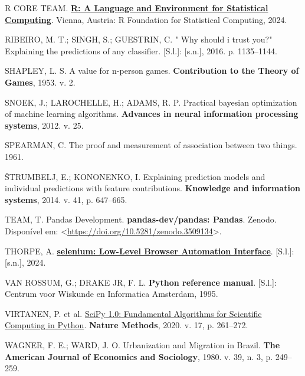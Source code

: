 \documentclass[
  12pt,
  a4paper,
]{scrreprt}
\newlength{\cslhangindent}
\newenvironment{CSLReferences}[2] %
 {\begin{list}{}{%
  \setlength{\itemindent}{0pt}
  \setlength{\leftmargin}{0pt}
  \setlength{\parsep}{0pt}
  \ifodd #1
   \setlength{\leftmargin}{\cslhangindent}
   \setlength{\itemindent}{-1\cslhangindent}
  \fi
  \setlength{\itemsep}{#2\baselineskip}}}
 {\end{list}}
\begin{document}
\begin{CSLReferences}{0}{1}
R CORE TEAM. \textbf{\href{https://www.R-project.org/}{R: A Language and
Environment for Statistical Computing}}. Vienna, Austria: R Foundation
for Statistical Computing, 2024.

RIBEIRO, M. T.; SINGH, S.; GUESTRIN, C. " Why should i trust you?"
Explaining the predictions of any classifier. {[}S.l.{]}: {[}s.n.{]},
2016. p. 1135--1144.

SHAPLEY, L. S. A value for n-person games. \textbf{Contribution to the
Theory of Games}, 1953. v. 2.

SNOEK, J.; LAROCHELLE, H.; ADAMS, R. P. Practical bayesian optimization
of machine learning algorithms. \textbf{Advances in neural information
processing systems}, 2012. v. 25.

SPEARMAN, C. The proof and measurement of association between two
things. 1961.

ŠTRUMBELJ, E.; KONONENKO, I. Explaining prediction models and individual
predictions with feature contributions. \textbf{Knowledge and
information systems}, 2014. v. 41, p. 647--665.

TEAM, T. Pandas Development. \textbf{pandas-dev/pandas: Pandas}. Zenodo.
Disponível em:
\textless{}\url{https://doi.org/10.5281/zenodo.3509134}\textgreater.

THORPE, A.
\textbf{\href{https://CRAN.R-project.org/package=selenium}{selenium:
Low-Level Browser Automation Interface}}. {[}S.l.{]}: {[}s.n.{]}, 2024.

VAN ROSSUM, G.; DRAKE JR, F. L. \textbf{Python reference manual}.
{[}S.l.{]}: Centrum voor Wiskunde en Informatica Amsterdam, 1995.

VIRTANEN, P. et al.
\href{https://doi.org/10.1038/s41592-019-0686-2}{{{SciPy} 1.0:
Fundamental Algorithms for Scientific Computing in Python}}.
\textbf{Nature Methods}, 2020. v. 17, p. 261--272.

WAGNER, F. E.; WARD, J. O. Urbanization and Migration in Brazil.
\textbf{The American Journal of Economics and Sociology}, 1980. v. 39,
n. 3, p. 249--259.


\end{CSLReferences}
\end{document}
